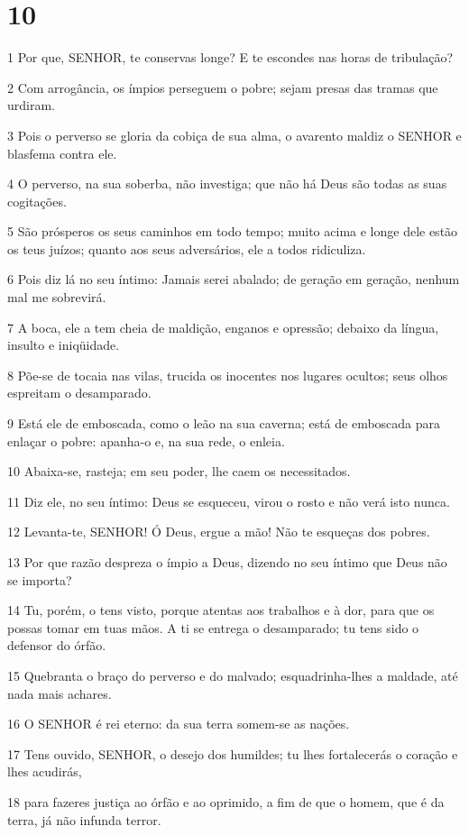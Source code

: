 \chapter{10}

\par 1 Por que, SENHOR, te conservas longe? E te escondes nas horas de tribulação?
\par 2 Com arrogância, os ímpios perseguem o pobre; sejam presas das tramas que urdiram.
\par 3 Pois o perverso se gloria da cobiça de sua alma, o avarento maldiz o SENHOR e blasfema contra ele.
\par 4 O perverso, na sua soberba, não investiga; que não há Deus são todas as suas cogitações.
\par 5 São prósperos os seus caminhos em todo tempo; muito acima e longe dele estão os teus juízos; quanto aos seus adversários, ele a todos ridiculiza.
\par 6 Pois diz lá no seu íntimo: Jamais serei abalado; de geração em geração, nenhum mal me sobrevirá.
\par 7 A boca, ele a tem cheia de maldição, enganos e opressão; debaixo da língua, insulto e iniqüidade.
\par 8 Põe-se de tocaia nas vilas, trucida os inocentes nos lugares ocultos; seus olhos espreitam o desamparado.
\par 9 Está ele de emboscada, como o leão na sua caverna; está de emboscada para enlaçar o pobre: apanha-o e, na sua rede, o enleia.
\par 10 Abaixa-se, rasteja; em seu poder, lhe caem os necessitados.
\par 11 Diz ele, no seu íntimo: Deus se esqueceu, virou o rosto e não verá isto nunca.
\par 12 Levanta-te, SENHOR! Ó Deus, ergue a mão! Não te esqueças dos pobres.
\par 13 Por que razão despreza o ímpio a Deus, dizendo no seu íntimo que Deus não se importa?
\par 14 Tu, porém, o tens visto, porque atentas aos trabalhos e à dor, para que os possas tomar em tuas mãos. A ti se entrega o desamparado; tu tens sido o defensor do órfão.
\par 15 Quebranta o braço do perverso e do malvado; esquadrinha-lhes a maldade, até nada mais achares.
\par 16 O SENHOR é rei eterno: da sua terra somem-se as nações.
\par 17 Tens ouvido, SENHOR, o desejo dos humildes; tu lhes fortalecerás o coração e lhes acudirás,
\par 18 para fazeres justiça ao órfão e ao oprimido, a fim de que o homem, que é da terra, já não infunda terror.

